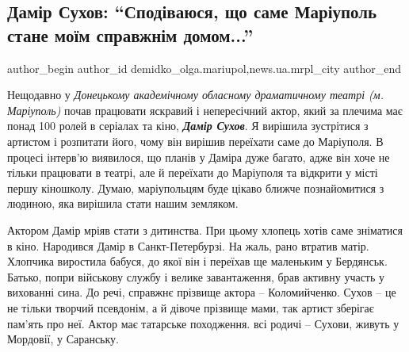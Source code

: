  
 
 
 
 
 
\subsection{Дамір Сухов: \enquote{Сподіваюся, що саме Маріуполь стане моїм справжнім домом...}}
\label{sec:31_01_2022.stz.news.ua.mrpl_city.1.damir_suhov}
 
\ifcmt
 author_begin
   author_id demidko_olga.mariupol,news.ua.mrpl_city
 author_end
\fi


Нещодавно у \emph{Донецькому академічному обласному драматичному театрі (м.
Маріуполь)} почав працювати яскравий і непересічний актор, який за плечима має
понад 100 ролей в серіалах та кіно, \emph{\textbf{Дамір Сухов}}. Я вирішила зустрітися з
артистом і розпитати його, чому він вирішив переїхати саме до Маріуполя. В
процесі інтерв'ю виявилося, що планів у Даміра дуже багато, адже він хоче не
тільки працювати в театрі, але й переїхати до Маріуполя та відкрити у місті
першу кіношколу. Думаю, маріупольцям буде цікаво ближче познайомитися з
людиною, яка вирішила стати нашим земляком.


Актором Дамір мріяв стати з дитинства. При цьому хлопець хотів саме зніматися в
кіно. Народився Дамір в Санкт-Петербурзі. На жаль, рано втратив матір. Хлопчика
виростила бабуся, до якої він і переїхав ще маленьким у Бердянськ. Батько,
попри військову службу і велике завантаження, брав активну участь у вихованні
сина. До речі, справжнє прізвище актора – Коломийченко. Сухов – це не тільки
творчий псевдонім, а й дівоче прізвище мами, так артист зберігає пам'ять про
неї. Актор має татарське походження. всі родичі – Сухови, живуть у Мордовії, у
Саранську.

